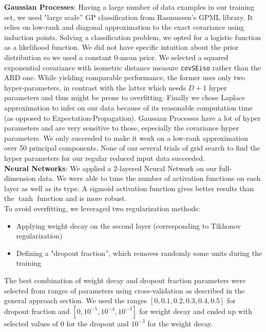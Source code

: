 \documentclass[10pt,a4paper]{article}
\begin{document}
  \textbf{Gaussian Processes}: Having a large number of data examples in our training set, we used "large scale'' GP classification from Rasmussen's GPML library. It relies on low-rank and diagonal approximation to the exact covariance using induction points. Solving a classification problem, we opted for a logistic function as a likelihood function. We did not have specific intuition about the prior distribution so we used a constant 0-mean prior. We selected a squared exponential covariance with isometric distance measure \texttt{covSEiso} rather than the ARD one. While yielding comparable performance, the former uses only two hyper-parameters, in contrast with the latter which needs $D+1$ hyper parameters and thus might be prone to overfitting. Finally we chose Laplace approximation to infer on our data because of its reasonable computation time (as opposed to Expectation-Propagation). Gaussian Processes have a lot of hyper parameters and are very sensitive to those, especially the covariance hyper parameters. We only succeeded to make it work on a low-rank approximation over 50 principal components. None of our several trials of grid search to find the hyper parameters for our regular reduced input data succeeded.\\

    \textbf{Neural Networks}: We applied a 2-layered Neural Network on our full-dimension data. We were able to tune the number of activation functions on each layer as well as its type. A sigmoid activation function gives better results than the $\tanh$ function and is more robust.\\
  To avoid overfitting, we leveraged two regularization methods:
  \begin{itemize}
   	\item Applying weight decay on the second layer (corresponding to Tikhonov regularization)
	  \item Defining a "dropout fraction'', which removes randomly some units during the training \cite{dropout}
  \end{itemize}
	The best combination of weight decay and dropout fraction parameters were selected from ranges of parameters using cross-validation as described in the general approach section. We used  the ranges $[0, 0.1, 0.2, 0.3, 0.4, 0.5]$ for dropout fraction and $[0, 10^{-5}, 10^{-4}, 10^{-3}]$ for weight decay and ended up with selected values of $0$ for the dropout and $10^{-3}$ for the weight decay.\\
\end{document}
